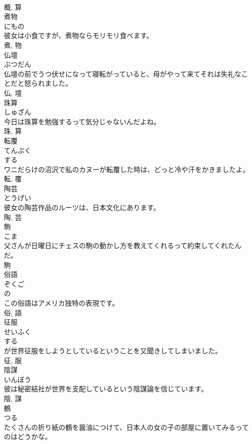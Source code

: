 \documentclass[8pt]{extreport}
\begin{document}
\begin{CJK}{UTF8}{min}
\\	概, 算	
\\	煮物	
\\	にもの	
\\	彼女は小食ですが、煮物ならモリモリ食べます。	
\\	煮, 物	
\\	仏壇	
\\	ぶつだん	
\\	仏壇の前でうつ伏せになって寝転がっていると、母がやって来てそれは失礼なことだと怒られました。	
\\	仏, 壇	
\\	珠算	
\\	しゅざん	
\\	今日は珠算を勉強するって気分じゃないんだよね。	
\\	珠, 算	
\\	転覆	
\\	てんぷく	
\\	する 
\\	ワニだらけの沼沢で私のカヌーが転覆した時は、どっと冷や汗をかきましたよ。	
\\	転, 覆	
\\	陶芸	
\\	とうげい	
\\	彼女の陶芸作品のルーツは、日本文化にあります。	
\\	陶, 芸	
\\	駒	
\\	こま	
\\	父さんが日曜日にチェスの駒の動かし方を教えてくれるって約束してくれたんだ。	
\\	駒	
\\	俗語	
\\	ぞくご	
\\	の 
\\	この俗語はアメリカ独特の表現です。	
\\	俗, 語	
\\	征服	
\\	せいふく	
\\	する 
\\	が世界征服をしようとしているということを又聞きしてしまいました。	
\\	征, 服	
\\	陰謀	
\\	いんぼう	
\\	彼は秘密結社が世界を支配しているという陰謀論を信じています。	
\\	陰, 謀	
\\	鶴	
\\	つる	
\\	たくさんの折り紙の鶴を醤油につけて、日本人の女の子の部屋に置いてみるってのはどうかな。	

\end{CJK}
\end{document}
